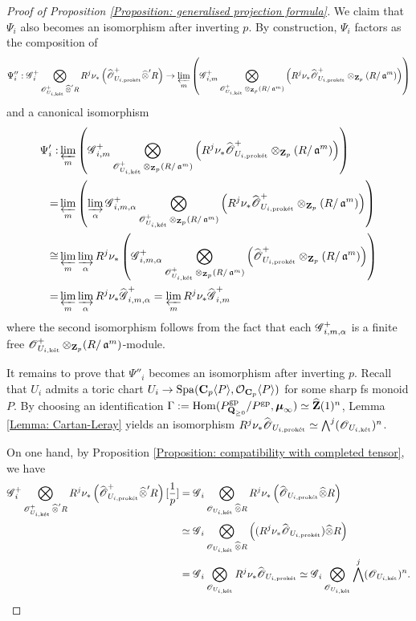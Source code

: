 \begin{proof}[Proof of Proposition \ref{Proposition: generalised projection formula}]
We claim that $\Psi_i$ also becomes an isomorphism after inverting $p$. By construction, $\Psi_i$ factors as the composition of
$$
\Psi''_i:\scrG_{i}^+ \bigotimes_{\scrO^+_{U_{i, \ket}}\widehat{\otimes}' R}R^j\nu_*\left(\widehat{\scrO}^+_{U_{i, \proket}}\widehat{\otimes}' R\right)\rightarrow \varprojlim_m\left(\scrG^+_{i,m}\bigotimes_{\scrO^+_{U_{i,\ket}}\otimes_{\Z_p}(R/\fraka^m)}\left(R^j\nu_*\widehat{\scrO}^+_{U_{i,\proket}}\otimes_{\Z_p} (R/\fraka^m)\right)\right)
$$
and a canonical isomorphism
\begin{align*}
\Psi'_i: & \varprojlim_m\left(\scrG^+_{i,m}\bigotimes_{\scrO^+_{U_{i,\ket}}\otimes_{\Z_p}(R/\fraka^m)}\left(R^j\nu_*\widehat{\scrO}^+_{U_{i,\proket}}\otimes_{\Z_p} (R/\fraka^m)\right)\right)\\ = &\varprojlim_m\left(\varinjlim_{\alpha}\scrG^+_{i,m,\alpha}\bigotimes_{\scrO^+_{U_{i,\ket}}\otimes_{\Z_p}(R/\fraka^m)}\left(R^j\nu_*\widehat{\scrO}^+_{U_{i,\proket}}\otimes_{\Z_p} (R/\fraka^m)\right)\right)\\
\cong & \varprojlim_m\varinjlim_{\alpha}R^j\nu_*\left(\scrG^+_{i,m,\alpha}\bigotimes_{\scrO^+_{U_{i,\ket}}\otimes_{\Z_p}(R/\fraka^m)}\left(\widehat{\scrO}^+_{U_{i,\proket}}\otimes_{\Z_p} (R/\fraka^m)\right)\right)\\
=&\varprojlim_m\varinjlim_{\alpha} R^j\nu_* \widehat{\scrG}^+_{i,m,\alpha}=\varprojlim_mR^j\nu_*\widehat{\scrG}^+_{i,m}
\end{align*}
where the second isomorphism follows from the fact that each $\scrG^+_{i,m,\alpha}$ is a finite free $\scrO^+_{U_{i,\ket}}\otimes_{\Z_p} (R/\fraka^m)$-module.

It remains to prove that $\Psi''_i$ becomes an isomorphism after inverting $p$. Recall that $U_i$ admits a toric chart $U_i\rightarrow \Spa(\C_p\langle P\rangle, \calO_{\C_p}\langle P\rangle)$ for some sharp fs monoid $P$. By choosing an identification $\Gamma:=\Hom(P^{\mathrm{gp}}_{\Q_{\geq 0}}/P^{\mathrm{gp}}, \boldsymbol{\mu}_{\infty})\simeq \widehat{\Z}(1)^n$, Lemma \ref{Lemma: Cartan-Leray} yields an isomorphism $R^j\nu_* \widehat{\scrO}_{U_{i,\proket}}\simeq \bigwedge^j (\scrO_{U_{i,\ket}})^n$.

On one hand, by Proposition \ref{Proposition: compatibility with completed tensor}, we have
\begin{align*}
\scrG_{i}^+ \bigotimes_{\scrO^+_{U_{i, \ket}}\widehat{\otimes}' R}R^j\nu_*\left(\widehat{\scrO}^+_{U_{i, \proket}}\widehat{\otimes}' R\right)[\frac{1}{p}] & =\scrG_{i} \bigotimes_{\scrO_{U_{i, \ket}}\widehat{\otimes} R}R^j\nu_*\left(\widehat{\scrO}_{U_{i, \proket}}\widehat{\otimes} R\right)\\
& \simeq \scrG_{i} \bigotimes_{\scrO_{U_{i, \ket}}\widehat{\otimes} R}\left((R^j\nu_*\widehat{\scrO}_{U_{i, \proket}})\widehat{\otimes} R\right)\\
& =\scrG_i \bigotimes_{\scrO_{U_{i,\ket}}}R^j\nu_*\widehat{\scrO}_{U_{i,\proket}}\simeq \scrG_i \bigotimes_{\scrO_{U_{i,\ket}}} \bigwedge^j (\scrO_{U_{i,\ket}})^n.
\end{align*}


\end{proof}
